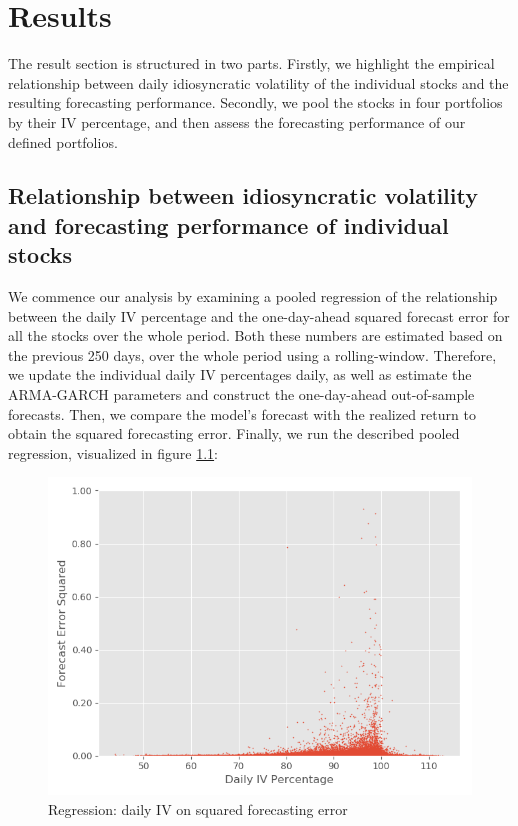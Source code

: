 \chapter{Results}
The result section is structured in two parts. Firstly, we highlight the empirical relationship between daily idiosyncratic volatility of the individual stocks and the resulting forecasting performance. Secondly, we pool the stocks in four portfolios by their IV percentage, and then assess the forecasting performance of our defined portfolios.

\section*{Relationship between idiosyncratic volatility  and forecasting performance of individual stocks}

We commence our analysis by examining a pooled regression of the relationship between the daily IV percentage and the one-day-ahead squared forecast error for all the stocks over the whole period. Both these numbers are estimated based on the previous 250 days, over the whole period using a rolling-window. Therefore, we update the individual daily IV percentages daily, as well as estimate the ARMA-GARCH parameters and construct the one-day-ahead out-of-sample forecasts. Then, we compare the model's forecast with the realized return to obtain the squared forecasting error. Finally, we run the described pooled regression, visualized in figure \ref{Scatter regression}: 

\begin{figure}[h]
    \centering
    \includegraphics[scale = 0.5]{Plot/ScatterRegression.png}
    \caption{Regression: daily IV on squared forecasting error}
    \label{Scatter regression}
\end{figure}

